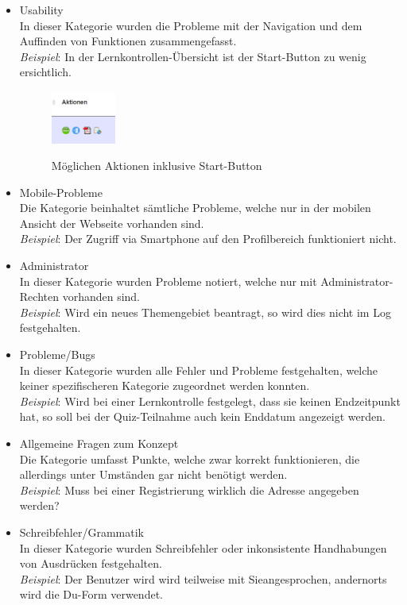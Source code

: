 \begin{itemize}
		
		\item Usability \\
		In dieser Kategorie wurden die Probleme mit der Navigation und dem Auffinden von Funktionen zusammengefasst. \\
		\textit{Beispiel}: In der Lernkontrollen-Übersicht ist der Start-Button zu wenig ersichtlich.
		\begin{figure}[H]
			\centering
			\includegraphics[width=0.20\textwidth]
			{Images/MobileQuizAlteVersionStartbutton.png}
			\caption{Möglichen Aktionen inklusive Start-Button}
			\cite{mobilequiz.ch}
		\end{figure}
		\item Mobile-Probleme \\
		Die Kategorie beinhaltet sämtliche Probleme, welche nur in der mobilen Ansicht der Webseite vorhanden sind. \\
		\textit{Beispiel}: Der Zugriff via Smartphone auf den Profilbereich funktioniert nicht.
		\item Administrator \\
		In dieser Kategorie wurden Probleme notiert, welche nur mit Administrator-Rechten vorhanden sind. \\
		\textit{Beispiel}: Wird ein neues Themengebiet beantragt, so wird dies nicht im Log festgehalten.
		\item Probleme/Bugs \\
		In dieser Kategorie wurden alle Fehler und Probleme festgehalten, welche keiner spezifischeren Kategorie zugeordnet werden konnten. \\
		\textit{Beispiel}: Wird bei einer Lernkontrolle festgelegt, dass sie keinen Endzeitpunkt hat, so soll bei der Quiz-Teilnahme auch kein Enddatum angezeigt werden.
		\item Allgemeine Fragen zum Konzept \\
		Die Kategorie umfasst Punkte, welche zwar korrekt funktionieren, die allerdings unter Umständen gar nicht benötigt werden. \\
		\textit{Beispiel}: Muss bei einer Registrierung wirklich die Adresse angegeben werden?
		\item Schreibfehler/Grammatik \\
		In dieser Kategorie wurden Schreibfehler oder inkonsistente Handhabungen von Ausdrücken festgehalten. \\
		\textit{Beispiel}: Der Benutzer wird wird teilweise mit \glq Sie\grq angesprochen, andernorts wird die \glq Du\grq-Form verwendet.
	\end{itemize}

